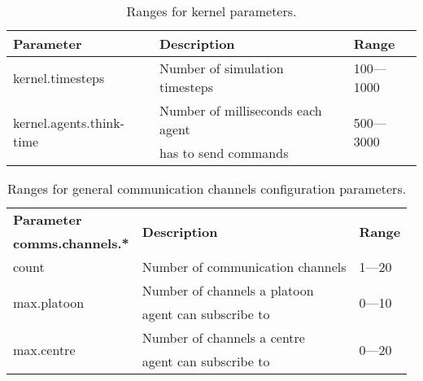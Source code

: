 \documentclass{article}
\begin{document}
\begin{table}[htb]
\caption{Ranges for kernel parameters.}
\label{tab:3}
\centering
\begin{tabular}{lll}
  \hline
  \textbf{Parameter}                        & \textbf{Description}             
  & \textbf{Range}\\
  \hline
  kernel.timesteps                          & Number of simulation timesteps   
  & 100---1000\\
  \hline
  \multirow{2}{*}{kernel.agents.think-time} & Number of milliseconds each agent
  & \multirow{2}{*}{500---3000}\\
                                            & has to send commands             
                                            & \\
  \hline
\end{tabular}
\end{table}

\begin{table}[htb]
\caption{Ranges for general communication channels configuration parameters.}
\label{tab:4}
\centering
\begin{tabular}{lll}
  \hline
  \textbf{Parameter}            & \multirow{2}{*}{\textbf{Description}} &
  \multirow{2}{*}{\textbf{Range}}\\
  \textbf{comms.channels.*}     &                                       & \\
  \hline
  count                         & Number of communication channels      &
  1---20\\
  \hline
  \multirow{2}{*}{max.platoon}  & Number of channels a platoon          &
  \multirow{2}{*}{0---10}\\
                                & agent can subscribe to                & \\
  \hline
  \multirow{2}{*}{max.centre}   & Number of channels a centre           & 
  \multirow{2}{*}{0---20}\\
                                & agent can subscribe to                & \\
  \hline
\end{tabular}
\end{table}
\end{document}
